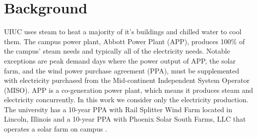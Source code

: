 \section{Background}

UIUC uses steam to heat a majority of it's buildings and chilled water to cool them. The campus power plant, Abbott Power Plant (APP), produces 100\% of the campus' steam needs and typically all of the electricity needs. Notable exceptions are peak demand days where the power output of APP, the solar farm, and the wind power purchase agreement (PPA), must be supplemented with electricity purchased from the Mid-continent Independent System Operator (MISO). APP is a co-generation power plant, which means it produces steam and electricity concurrently. In this work we consider only the electricity production. The university has a 10-year PPA with Rail Splitter Wind Farm located in Lincoln, Illinois and a 10-year PPA with Phoenix Solar South Farms, LLC that operates a solar farm on campus \cite{breitweiser_wind_2016,white_solar_2017}. 